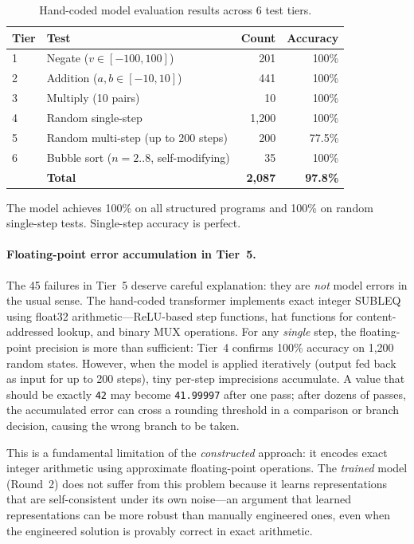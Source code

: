 \documentclass[11pt,a4paper]{article}
\begin{document}
\begin{table}[h]
\centering
\caption{Hand-coded model evaluation results across 6 test tiers.}
\label{tab:round1_eval}
\begin{tabular}{llrr}
\toprule
\textbf{Tier} & \textbf{Test} & \textbf{Count} & \textbf{Accuracy} \\
\midrule
1 & Negate ($v \in [-100, 100]$) & 201 & 100\% \\
2 & Addition ($a, b \in [-10, 10]$) & 441 & 100\% \\
3 & Multiply (10 pairs) & 10 & 100\% \\
4 & Random single-step & 1{,}200 & 100\% \\
5 & Random multi-step (up to 200 steps) & 200 & 77.5\% \\
6 & Bubble sort ($n = 2..8$, self-modifying) & 35 & 100\% \\
\midrule
& \textbf{Total} & \textbf{2{,}087} & \textbf{97.8\%} \\
\bottomrule
\end{tabular}
\end{table}

The model achieves 100\% on all structured programs and 100\% on random single-step tests.
Single-step accuracy is perfect.

\paragraph{Floating-point error accumulation in Tier~5.}
The 45 failures in Tier~5 deserve careful explanation: they are \emph{not} model errors in the usual sense.
The hand-coded transformer implements exact integer SUBLEQ using float32 arithmetic---ReLU-based step functions, hat functions for content-addressed lookup, and binary MUX operations.
For any \emph{single} step, the floating-point precision is more than sufficient: Tier~4 confirms 100\% accuracy on 1{,}200 random states.
However, when the model is applied iteratively (output fed back as input for up to 200 steps), tiny per-step imprecisions accumulate.
A value that should be exactly \texttt{42} may become \texttt{41.99997} after one pass; after dozens of passes, the accumulated error can cross a rounding threshold in a comparison or branch decision, causing the wrong branch to be taken.

This is a fundamental limitation of the \emph{constructed} approach: it encodes exact integer arithmetic using approximate floating-point operations.
The \emph{trained} model (Round~2) does not suffer from this problem because it learns representations that are self-consistent under its own noise---an argument that learned representations can be more robust than manually engineered ones, even when the engineered solution is provably correct in exact arithmetic.
\end{document}
